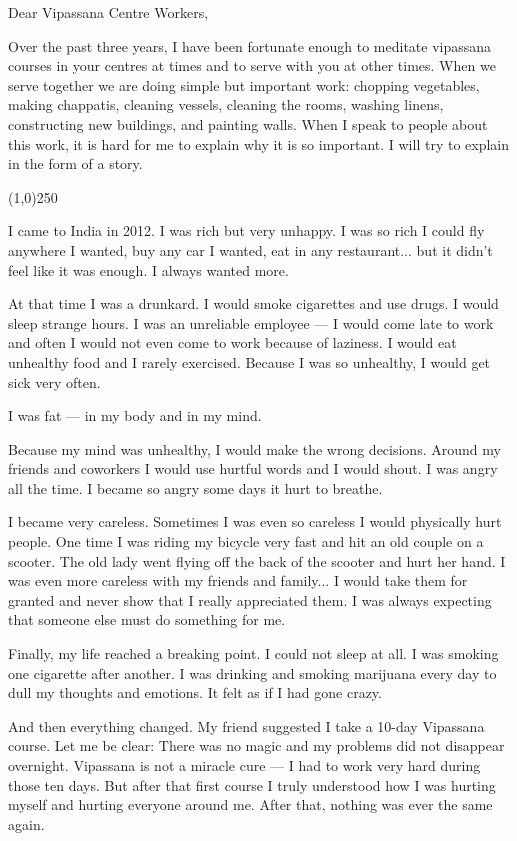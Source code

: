 \documentclass{article}
\begin{document}
Dear Vipassana Centre Workers,

Over the past three years, I have been fortunate enough to meditate vipassana courses
in your centres at times and to serve with you at other times. When we serve together
we are doing simple but important work: chopping vegetables, making chappatis,
cleaning vessels, cleaning the rooms, washing linens, constructing new buildings, and
painting walls. When I speak to people about this work, it is hard for me to explain
why it is so important. I will try to explain in the form of a story.

\begin{center}
\line(1,0){250}
\end{center}

I came to India in 2012. I was rich but very unhappy. I was so rich I could fly
anywhere I wanted, buy any car I wanted, eat in any restaurant... but it didn't feel
like it was enough. I always wanted more.

At that time I was a drunkard. I would smoke cigarettes and
use drugs. I would sleep strange hours. I was an unreliable employee --- I would come
late to work and often I would not even come to work because of laziness. I would eat
unhealthy food and I rarely exercised. Because I was so unhealthy, I would get sick
very often.

I was fat --- in my body and in my mind.

Because my mind was unhealthy, I would make the wrong decisions. Around my friends
and coworkers I would use hurtful words and I would shout. I was angry all the
time. I became so angry some days it hurt to breathe.

I became very careless. Sometimes I was even so careless I would physically hurt
people. One time I was riding my bicycle very fast and hit an old couple on a
scooter. The old lady went flying off the back of the scooter and hurt her hand. I
was even more careless with my friends and family... I would take them for granted
and never show that I really appreciated them. I was always expecting that someone
else must do something for me.

Finally, my life reached a breaking point. I could not sleep at all. I was smoking
one cigarette after another. I was drinking and smoking marijuana every day to dull
my thoughts and emotions. It felt as if I had gone crazy.

And then everything changed. My friend suggested I take a 10-day Vipassana
course. Let me be clear: There was no magic and my problems did not disappear
overnight. Vipassana is not a miracle cure --- I had to work very hard during those
ten days. But after that first course I truly understood how I was hurting myself
and hurting everyone around me. After that, nothing was ever the same again.
\end{document}
